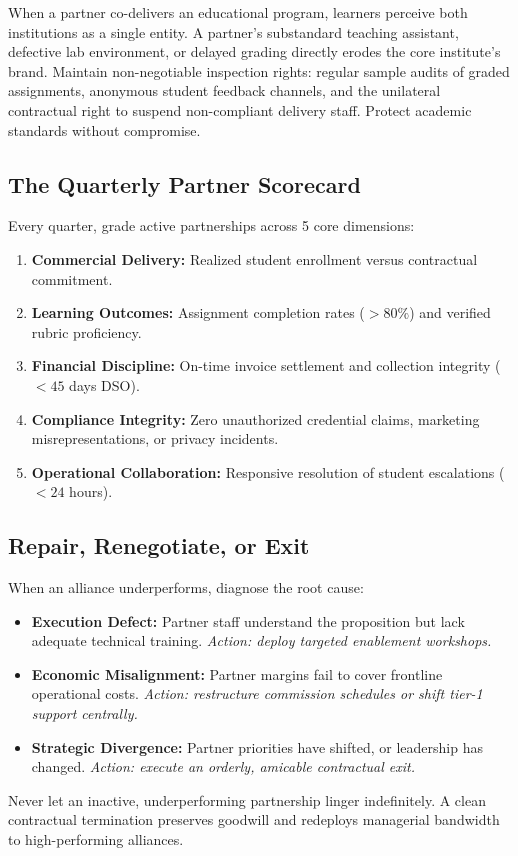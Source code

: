 When a partner co-delivers an educational program, learners perceive both institutions as a single entity. A partner's substandard teaching assistant, defective lab environment, or delayed grading directly erodes the core institute's brand. Maintain non-negotiable inspection rights: regular sample audits of graded assignments, anonymous student feedback channels, and the unilateral contractual right to suspend non-compliant delivery staff. Protect academic standards without compromise.

\subsection{The Quarterly Partner Scorecard}
\label{sec:quarterly_partner_scorecard}

Every quarter, grade active partnerships across 5 core dimensions:
\begin{enumerate}
\item \textbf{Commercial Delivery:} Realized student enrollment versus contractual commitment.
\item \textbf{Learning Outcomes:} Assignment completion rates ($>80\%$) and verified rubric proficiency.
\item \textbf{Financial Discipline:} On-time invoice settlement and collection integrity ($<45$ days DSO).
\item \textbf{Compliance Integrity:} Zero unauthorized credential claims, marketing misrepresentations, or privacy incidents.
\item \textbf{Operational Collaboration:} Responsive resolution of student escalations ($<24$ hours).
\end{enumerate}

\subsection{Repair, Renegotiate, or Exit}
\label{sec:repair_renegotiate_exit}

When an alliance underperforms, diagnose the root cause:
\begin{itemize}
\item \textbf{Execution Defect:} Partner staff understand the proposition but lack adequate technical training. \textit{Action: deploy targeted enablement workshops.}
\item \textbf{Economic Misalignment:} Partner margins fail to cover frontline operational costs. \textit{Action: restructure commission schedules or shift tier-1 support centrally.}
\item \textbf{Strategic Divergence:} Partner priorities have shifted, or leadership has changed. \textit{Action: execute an orderly, amicable contractual exit.}
\end{itemize}
Never let an inactive, underperforming partnership linger indefinitely. A clean contractual termination preserves goodwill and redeploys managerial bandwidth to high-performing alliances.
